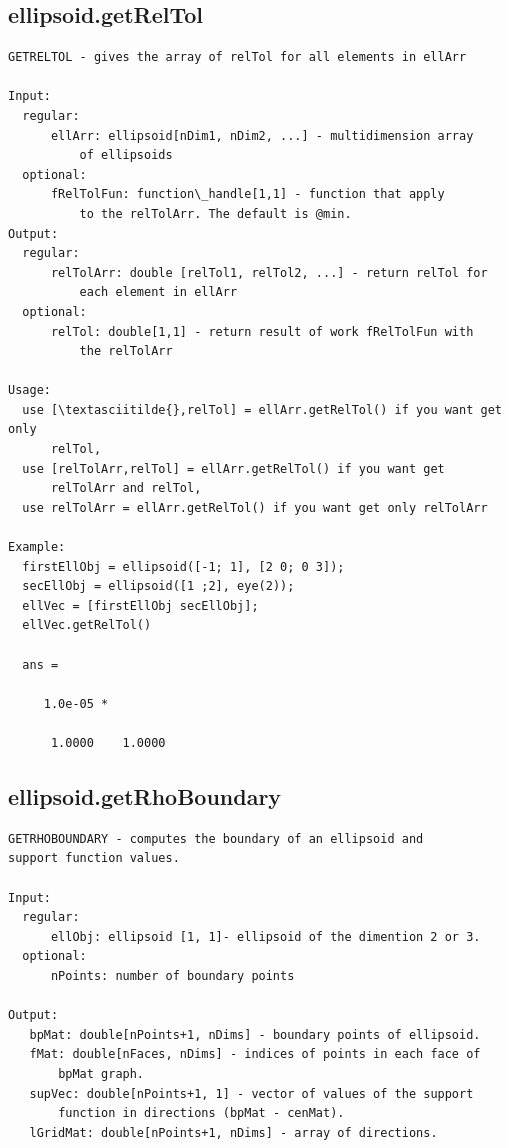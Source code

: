 \documentclass[letterpaper,10pt,english]{sphinxmanual}
\begin{document}
\subsection{ellipsoid.getRelTol}
\label{chap_functions:ellipsoid-getreltol}
\begin{Verbatim}[commandchars=\\\{\}]
GETRELTOL - gives the array of relTol for all elements in ellArr

Input:
  regular:
      ellArr: ellipsoid[nDim1, nDim2, ...] - multidimension array
          of ellipsoids
  optional:
      fRelTolFun: function\_handle[1,1] - function that apply
          to the relTolArr. The default is @min.
Output:
  regular:
      relTolArr: double [relTol1, relTol2, ...] - return relTol for
          each element in ellArr
  optional:
      relTol: double[1,1] - return result of work fRelTolFun with
          the relTolArr

Usage:
  use [\textasciitilde{},relTol] = ellArr.getRelTol() if you want get only
      relTol,
  use [relTolArr,relTol] = ellArr.getRelTol() if you want get
      relTolArr and relTol,
  use relTolArr = ellArr.getRelTol() if you want get only relTolArr

Example:
  firstEllObj = ellipsoid([-1; 1], [2 0; 0 3]);
  secEllObj = ellipsoid([1 ;2], eye(2));
  ellVec = [firstEllObj secEllObj];
  ellVec.getRelTol()

  ans =

     1.0e-05 *

      1.0000    1.0000
\end{Verbatim}


\subsection{ellipsoid.getRhoBoundary}
\label{chap_functions:ellipsoid-getrhoboundary}
\begin{Verbatim}[commandchars=\\\{\}]
GETRHOBOUNDARY - computes the boundary of an ellipsoid and
support function values.

Input:
  regular:
      ellObj: ellipsoid [1, 1]- ellipsoid of the dimention 2 or 3.
  optional:
      nPoints: number of boundary points

Output:
   bpMat: double[nPoints+1, nDims] - boundary points of ellipsoid.
   fMat: double[nFaces, nDims] - indices of points in each face of
       bpMat graph.
   supVec: double[nPoints+1, 1] - vector of values of the support
       function in directions (bpMat - cenMat).
   lGridMat: double[nPoints+1, nDims] - array of directions.
\end{Verbatim}
\end{document}

